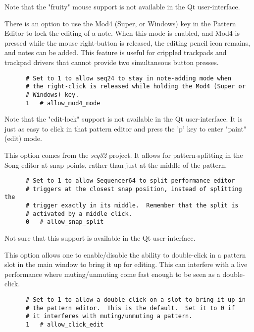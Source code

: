    Note that the "fruity" mouse support is not available in the Qt
   user-interface.

   There is an option to use the Mod4 (Super, or Windows) key in the
   Pattern Editor to lock the editing of a note.  When this mode is enabled,
   and Mod4 is pressed while the mouse right-button is released, the
   editing pencil icon remains, and notes can be added.  This feature is
   useful for crippled trackpads and trackpad drivers that cannot provide
   two simultaneous button presses.

   \begin{verbatim}
      # Set to 1 to allow seq24 to stay in note-adding mode when
      # the right-click is released while holding the Mod4 (Super or
      # Windows) key.
      1   # allow_mod4_mode
   \end{verbatim}

   Note that the "edit-lock" support is not available in the Qt
   user-interface.  It is just as easy to click in that pattern editor and
   press the 'p' key to enter "paint" (edit) mode.

   This option comes from the \textsl{seq32} project.  It allows for
   pattern-splitting in the Song editor at snap points, rather than just
   at the middle of the pattern.

   \begin{verbatim}
      # Set to 1 to allow Sequencer64 to split performance editor
      # triggers at the closest snap position, instead of splitting the
      # trigger exactly in its middle.  Remember that the split is
      # activated by a middle click.
      0   # allow_snap_split
   \end{verbatim}

   Not sure that this support is available in the Qt user-interface.

   This option allows one to enable/disable the ability to double-click
   in a pattern slot in the main window to bring it up for editing.  This
   can interfere with a live performance where muting/unmuting come fast enough
   to be seen as a double-click.

   \begin{verbatim}
      # Set to 1 to allow a double-click on a slot to bring it up in
      # the pattern editor.  This is the default.  Set it to 0 if
      # it interferes with muting/unmuting a pattern.
      1   # allow_click_edit
   \end{verbatim}

